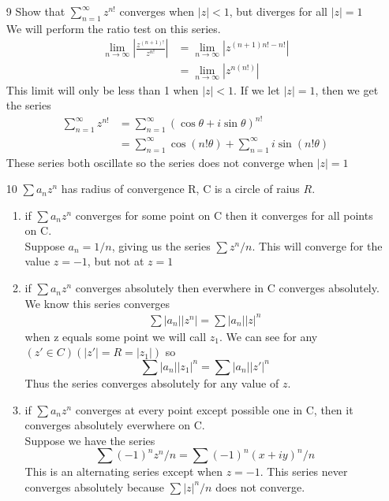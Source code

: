 \documentclass{article}
\begin{document}
\begin{enumerate}
\begin{enumerate}[label=\roman*]
      \end{enumerate}
    \item[9] Show that $\sum_{n=1}^\infty z^{n!}$ converges when $|z|<1$, but diverges for all $|z|=1$\\
      We will perform the ratio test on this series.
      \begin{align*}
        \lim_{n\to\infty}\left|\frac{z^{(n+1)!}}{z^{n!}}\right|&=\lim_{n\to\infty}\left|z^{(n+1)n!-n!}\right|\\
        &=\lim_{n\to\infty}|z^{n(n!)}|
      \end{align*}
      This limit will only be less than 1 when $|z|<1$. If we let $|z|=1$, then we get the series
      \begin{align*}
        \sum_{n=1}^\infty z^{n!}&=\sum_{n=1}^\infty(\cos\theta+i\sin\theta)^{n!}\\
        &=\sum_{n=1}^\infty \cos(n!\theta)+\sum_{n=1}^\infty i\sin(n!\theta)
      \end{align*}
      These series both oscillate so the series does not converge when $|z|=1$
    \item[10] $\sum a_nz^n$ has radius of convergence R, C is a circle of raius $R$.
      \begin{enumerate}[label=(\roman*)]
        \item if $\sum a_nz^n$ converges for some point on C then it converges for all points on C.\\
          Suppose $a_n=1/n$, giving us the series $\sum z^n/n$. This will converge for the value $z=-1$, but not at $z=1$
        \item if $\sum a_nz^n$ converges absolutely then everwhere in C converges absolutely.\\
          We know this series converges
          \begin{align*}
            \sum |a_n||z^n|=\sum |a_n||z|^n
          \end{align*}
          when z equals some point we will call $z_1$. We can see for any $(z'\in C)(|z'|=R=|z_1|)$ so
          \[\sum |a_n||z_1|^n=\sum |a_n||z'|^n\]
          Thus the series converges absolutely for any value of $z$.
        \item if $\sum a_nz^n$ converges at every point except possible one in C, then it converges absolutely everwhere on C.\\
          Suppose we have the series
          \[\sum (-1)^nz^n/n=\sum (-1)^n(x+iy)^n/n\]
          This is an alternating series except when $z=-1$. This series never converges absolutely because $\sum |z|^n/n$ does not converge.

\end{enumerate}
\end{enumerate}
\end{document}
